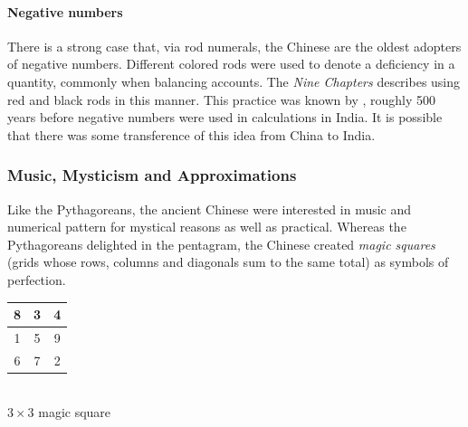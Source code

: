\paragraph{Negative numbers}

There is a strong case that, via rod numerals, the Chinese are the oldest adopters of negative numbers. Different colored rods were used to denote a deficiency in a quantity, commonly  when balancing accounts. The \emph{Nine Chapters} describes using red and black rods in this manner. This practice was known by , roughly 500 years before negative numbers were used in calculations in India. It is possible that there was some transference of this idea from China to India.

\subsubsection*{Music, Mysticism and Approximations}
	
\begin{minipage}[t]{0.75\linewidth}\vspace{-4pt}
Like the Pythagoreans, the ancient Chinese were interested in music and numerical pattern for mystical reasons as well as practical. Whereas the Pythagoreans delighted in the pentagram, the Chinese created \emph{magic squares} (grids whose rows, columns and diagonals sum to the same total) as symbols of perfection.
\end{minipage}
\hfill
\begin{minipage}[t]{0.2\linewidth}\vspace{-10pt}
	\centering
	\begin{tabular}{|c|c|c|}
		\hline
		8&3&4\\\hline
		1&5&9\\\hline
		6&7&2\\\hline
	\end{tabular}
	\\[5pt]
	$3\times 3$ magic square
\end{minipage}
\bigbreak

